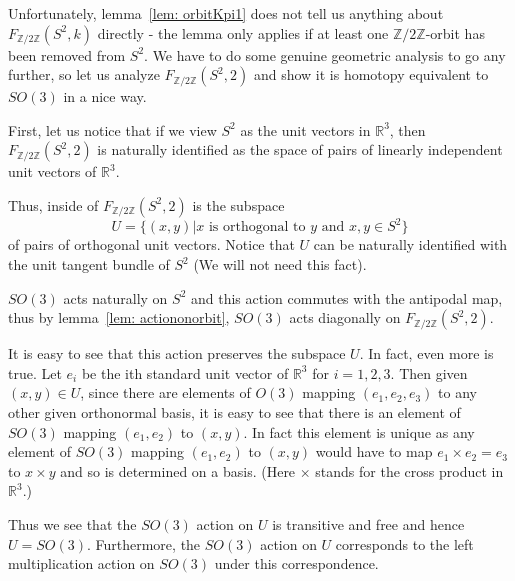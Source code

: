 \documentclass{amsart}
\newcommand{\RR}{\mathbb{R}}
\newcommand{\Ztwo}{\mathbb{Z}/2\mathbb{Z}}
\begin{document}
Unfortunately, lemma~\ref{lem: orbitKpi1} does not tell us anything
about $F_{\Ztwo}(S^2,k)$ directly - the lemma only applies if at least one 
$\Ztwo$-orbit
has been removed from $S^2$. We have to do some genuine geometric
analysis to go any further, so let us analyze $F_{\Ztwo}(S^2,2)$
and show it is homotopy equivalent to $SO(3)$ in a nice way.

First, let us notice that if we view $S^2$ as the unit vectors
in $\RR^3$, then $F_{\Ztwo}(S^2,2)$ is naturally identified as 
the space of pairs of linearly independent unit vectors of $\RR^3$.  

Thus, inside of $F_{\Ztwo}(S^2,2)$ is the subspace
$$
U = \{(x,y) | x \text{ is orthogonal to } y \text{ and } x,y \in S^2\}
$$
of pairs of orthogonal unit vectors. Notice that $U$ can be 
naturally identified with
the unit tangent bundle of $S^2$ (We will not need this fact).

$SO(3)$ acts naturally on $S^2$ and this action commutes with the
antipodal map, thus by lemma~\ref{lem: actiononorbit}, $SO(3)$
acts diagonally on $F_{\Ztwo}(S^2,2)$.

It is easy to see that this action preserves the subspace $U$.
In fact, even more is true. Let $e_i$ be the ith standard 
unit vector of $\RR^3$
for $i=1,2,3$. Then given $(x,y) \in U$, since there are elements of
$O(3)$ mapping $(e_1,e_2,e_3)$ to any other given orthonormal basis, 
it is easy to see
that there is an element of $SO(3)$ mapping $(e_1,e_2)$ to $(x,y)$.
In fact this element is unique as any element of $SO(3)$
mapping $(e_1,e_2)$ to $(x,y)$ would have to map $e_1 \times e_2 = e_3$
to $x \times y$ and so is determined on a basis. (Here $\times$ stands
for the cross product in $\RR^3$.)

Thus we see that the $SO(3)$ action on $U$ is transitive and free
and hence $U=SO(3)$. Furthermore, the $SO(3)$ action on $U$ corresponds
to the left multiplication action on $SO(3)$ under this correspondence. 
\end{document}
